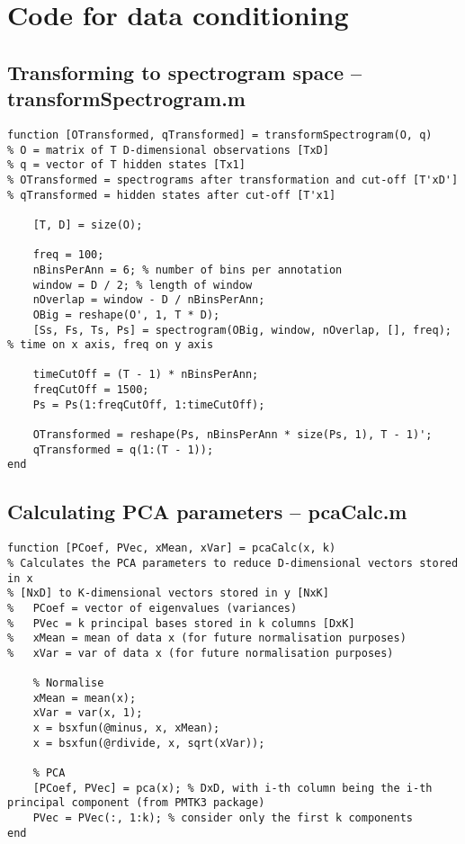 \chapter{Code for data conditioning}
\section{Transforming to spectrogram space -- transformSpectrogram.m}
\label{sec:transformSpectrogram}
\begin{lstlisting}
function [OTransformed, qTransformed] = transformSpectrogram(O, q)
% O = matrix of T D-dimensional observations [TxD]
% q = vector of T hidden states [Tx1]
% OTransformed = spectrograms after transformation and cut-off [T'xD']
% qTransformed = hidden states after cut-off [T'x1]

    [T, D] = size(O);

    freq = 100;
    nBinsPerAnn = 6; % number of bins per annotation
    window = D / 2; % length of window
    nOverlap = window - D / nBinsPerAnn;
    OBig = reshape(O', 1, T * D);
    [Ss, Fs, Ts, Ps] = spectrogram(OBig, window, nOverlap, [], freq); % time on x axis, freq on y axis
    
    timeCutOff = (T - 1) * nBinsPerAnn;
    freqCutOff = 1500;
    Ps = Ps(1:freqCutOff, 1:timeCutOff);

    OTransformed = reshape(Ps, nBinsPerAnn * size(Ps, 1), T - 1)';
    qTransformed = q(1:(T - 1));
end
\end{lstlisting}

\section{Calculating PCA parameters -- pcaCalc.m}
\label{sec:pcaCalc}
\begin{lstlisting}
function [PCoef, PVec, xMean, xVar] = pcaCalc(x, k)
% Calculates the PCA parameters to reduce D-dimensional vectors stored in x
% [NxD] to K-dimensional vectors stored in y [NxK]
%   PCoef = vector of eigenvalues (variances)
%   PVec = k principal bases stored in k columns [DxK]
%   xMean = mean of data x (for future normalisation purposes)
%   xVar = var of data x (for future normalisation purposes)
    
    % Normalise
    xMean = mean(x);
    xVar = var(x, 1);
    x = bsxfun(@minus, x, xMean);
    x = bsxfun(@rdivide, x, sqrt(xVar));
    
    % PCA
    [PCoef, PVec] = pca(x); % DxD, with i-th column being the i-th principal component (from PMTK3 package)
    PVec = PVec(:, 1:k); % consider only the first k components
end
\end{lstlisting}

